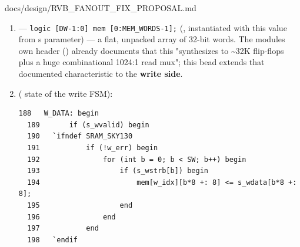 \begin{relocated}{docs/design/RVB_FANOUT_FIX_PROPOSAL.md}
\begin{enumerate}
  \begin{lstlisting}[language={}]
  334   W_DATA: begin
  335       _s_wdata  [s] = m_wdata [wsel[s]];
  336       _s_wstrb  [s] = m_wstrb [wsel[s]];
  337       _s_wlast  [s] = m_wlast [wsel[s]];
  338       _s_wvalid [s] = m_wvalid[wsel[s]];
  339   end
  \end{lstlisting}

  and  ---
  \texttt{assign\ s\_\allowbreak{}wvalid\ =\allowbreak{}\ \_\allowbreak{}s\_\allowbreak{}wvalid;}.
   is the per-slave grant register (set by the sequential
  grant FSM, ), so this is a
  \textbf{combinational master-select mux}: for the SRAM slave slot,
   passes  straight through
  to  ( in ) with
  only mux/\allowbreak{}select logic in between --- no register.
  w3a\textquotesingle s OpenSTA trace of the real post-CTS netlist
  confirms this abstractly as
  "AOI31/\allowbreak{}NOR3/\allowbreak{}AND5" arbitration gates on this
  exact path.
\item
   ---
  \texttt{logic\ [DW-\allowbreak{}1:\allowbreak{}0]\ mem\ [0:\allowbreak{}MEM\_\allowbreak{}WORDS-\allowbreak{}1];}
  (, instantiated with this value from
  \textquotesingle s  parameter)
  --- a flat, unpacked array of 32-bit words. The
  module\textquotesingle s own header ()
  already documents that this "synthesizes to \textasciitilde32K
  flip-flops plus a huge combinational 1024:1 read mux"; this bead
  extends that documented characteristic to the \textbf{write side}.
\item
   ( state of the
  write FSM):

  \begin{lstlisting}[language={}]
  188   W_DATA: begin
  189       if (s_wvalid) begin
  190   `ifndef SRAM_SKY130
  191           if (!w_err) begin
  192               for (int b = 0; b < SW; b++) begin
  193                   if (s_wstrb[b]) begin
  194                       mem[w_idx][b*8 +: 8] <= s_wdata[b*8 +: 8];
  195                   end
  196               end
  197           end
  198   `endif
  \end{lstlisting}


\end{enumerate}
\end{relocated}
